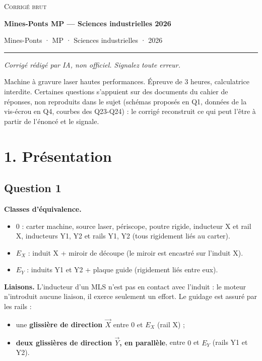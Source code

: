 \documentclass[11pt,a4paper]{article}
\providecommand{\tightlist}{\setlength{\itemsep}{0pt}\setlength{\parskip}{0pt}}
\begin{document}
\thispagestyle{plain}
\begin{center}
  {\small\scshape Corrigé brut}\par\smallskip
  {\LARGE\bfseries Mines-Ponts MP — Sciences industrielles 2026\par}\medskip
  {\large Mines-Ponts · MP · Sciences industrielles · 2026\par}
\end{center}
\vspace{2pt}\hrule\vspace{8pt}

\emph{Corrigé rédigé par IA, non officiel. Signalez toute erreur.}

Machine à gravure laser hautes performances. Épreuve de 3 heures, calculatrice interdite. Certaines questions s'appuient sur des documents du cahier de réponses, non reproduits dans le sujet (schémas proposés en Q1, données de la vis-écrou en Q4, courbes des Q23-Q24) : le corrigé reconstruit ce qui peut l'être à partir de l'énoncé et le signale.

\hypertarget{pruxe9sentation}{%
\section{1. Présentation}\label{pruxe9sentation}}

\hypertarget{question-1}{%
\subsection{Question 1}\label{question-1}}

\textbf{Classes d'équivalence.}

\begin{itemize}
\tightlist
\item
  \(0\) : carter machine, source laser, périscope, poutre rigide, inducteur X et rail X, inducteurs Y1, Y2 et rails Y1, Y2 (tous rigidement liés au carter).
\item
  \(E_X\) : induit X + miroir de découpe (le miroir est encastré sur l'induit X).
\item
  \(E_Y\) : induits Y1 et Y2 + plaque guide (rigidement liés entre eux).
\end{itemize}

\textbf{Liaisons.} L'inducteur d'un MLS n'est pas en contact avec l'induit : le moteur n'introduit aucune liaison, il exerce seulement un effort. Le guidage est assuré par les rails :

\begin{itemize}
\tightlist
\item
  une \textbf{glissière de direction \(\vec X\)} entre \(0\) et \(E_X\) (rail X) ;
\item
  \textbf{deux glissières de direction \(\vec Y\), en parallèle}, entre \(0\) et \(E_Y\) (rails Y1 et Y2).
\end{itemize}
\end{document}
